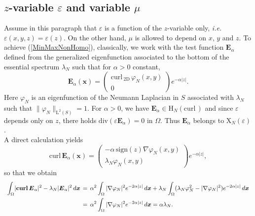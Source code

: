 \documentclass[11pt,a4paper]{article}
\newcommand{\dsp}{\displaystyle}
\newcommand{\eps}{\varepsilon}
\newcommand{\Om}{\Omega}
\newcommand{\mrm}[1]{\mathrm{#1}}
\newcommand{\bfx}{\boldsymbol{x}}
\newcommand{\mL}{\mrm{L}}
\newcommand{\mH}{\mrm{H}}
\newcommand{\mX}{\mrm{X}}
\newcommand{\curlvec}{\boldsymbol{\mrm{curl}}\,}
\renewcommand{\div}{\mrm{div}}
\def\E{\boldsymbol{E}}
\begin{document}
\subsection{$z$-variable $\eps$ and variable $\mu$}
Assume in this paragraph that $\eps$ is a function of the $z$-variable only, \textit{i.e.} $\eps(x,y,z)=\eps(z)$. On the other hand, $\mu$ is allowed to depend on $x$, $y$ and $z$. To achieve (\ref{MinMaxNonHomo}), classically, we work with the test function $\E_\alpha$ defined from the generalized eigenfunction associated to the bottom of the essential spectrum $\lambda_N$ such that for $\alpha>0$ constant, 
\begin{equation}\label{DefEModeTE}
\E_\alpha(\bfx)=\left(\begin{array}{c}
\curlvec_{\mrm{2D}}\,\varphi_N(x,y)\\
0
\end{array}\right)e^{-\alpha|z|}.
\end{equation}
Here $\varphi_N$ is an eigenfunction of the Neumann Laplacian in $S$ associated with $\lambda_N$ such that $\|\varphi_N\|_{\mL^2(S)}=1$. For $\alpha>0$, we have $\E_\alpha\in\boldsymbol{\mH}_N(\curlvec)$ and since $\eps$ depends only on $z$, there holds $\div(\eps\E_\alpha)=0$ in $\Om$. Thus $\E_\alpha$ belongs to $\boldsymbol{\mX}_N(\eps)$.\\
\newline
A direct calculation yields
\[
\curlvec\E_\alpha(\bfx)=\left(\begin{array}{c}
-\alpha\,\mrm{sign}(z)\nabla\varphi_N(x,y)\\[2pt]
\lambda_N\varphi_N(x,y)
\end{array}\right)e^{-\alpha|z|},
\]
so that we obtain
\begin{equation}\label{RelationHomogeneous}
\begin{array}{rcl}
\dsp\int_{\Om}\hspace{-0.05cm}|\curlvec\E_\alpha|^2-\lambda_N|\E_\alpha|^2\,d\bfx &\hspace{-0.2cm}=&\hspace{-0.2cm} \dsp\alpha^2\int_{\Om}|\nabla\varphi_N|^2e^{-2\alpha |z|}\,d\bfx+\lambda_N\int_{\Om}(\lambda_N\varphi_N^2-|\nabla\varphi_N|^2)e^{-2\alpha |z|}\,d\bfx\\[10pt]
&\hspace{-0.2cm}=&\hspace{-0.2cm} \dsp\alpha^2\int_{\Om}|\nabla\varphi_N|^2e^{-2\alpha |z|}\,d\bfx=\alpha\lambda_N.
\end{array}
\end{equation}
\end{document}
